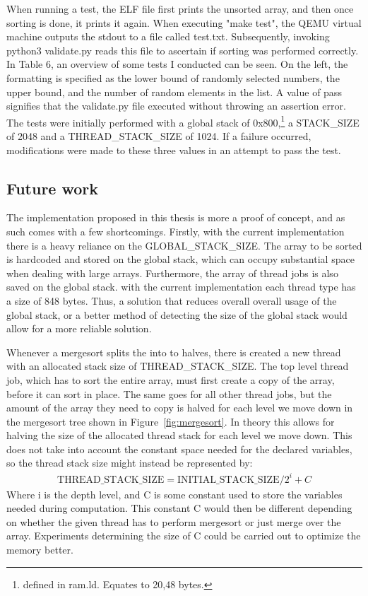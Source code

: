 When running a test, the ELF file first prints the unsorted array, and then once
sorting is done, it prints it again. When executing "make test", the QEMU
virtual machine outputs the stdout to a file called test.txt. Subsequently,
invoking python3 validate.py reads this file to ascertain if sorting was
performed correctly. In Table 6, an overview of some tests I conducted can be
seen. On the left, the formatting is specified as the lower bound of randomly
selected numbers, the upper bound, and the number of random elements in the
list. A value of pass signifies that the validate.py file executed without
throwing an assertion error. The tests were initially performed with a global
stack of 0x800,\footnote{defined in ram.ld. Equates to 20,48 bytes.} a
STACK\_SIZE of 2048 and a THREAD\_STACK\_SIZE of 1024. If a failure occurred,
modifications were made to these three values in an attempt to pass the test.

\subsection{Future work}
The implementation proposed in this thesis is more a proof of concept, and as
such comes with a few shortcomings. Firstly, with the current implementation
there is a heavy reliance on the GLOBAL\_STACK\_SIZE. The array to be sorted is
hardcoded and stored on the global stack, which can occupy substantial space
when dealing with large arrays. Furthermore, the array of thread jobs is also
saved on the global stack. with the current implementation each thread type has
a size of 848 bytes. Thus, a solution that reduces overall overall usage of the
global stack, or a better method of detecting the size of the global stack would
allow for a more reliable solution.

Whenever a mergesort splits the into to halves, there is created a new thread
with an allocated stack size of THREAD\_STACK\_SIZE. The top level thread job,
which has to sort the entire array, must first create a copy of the array, before
it can sort in place. The same goes for all other thread jobs, but the amount of
the array they need to copy is halved for each level we move down in the
mergesort tree shown in Figure~\ref{fig:mergesort}. In theory this allows for
halving the size of the allocated thread stack for each level we move down. This
does not take into account the constant space needed for the declared variables,
so the thread stack size might instead be represented by:
\begin{align}
  \text{THREAD\_STACK\_SIZE} = \text{INITIAL\_STACK\_SIZE} / 2^i + C
\end{align}
Where i is the depth level, and C is some constant used to store the variables
needed during computation. This constant C would then be different depending on
whether the given thread has to perform mergesort or just merge over the array.
Experiments determining the size of C could be carried out to optimize the
memory better.


